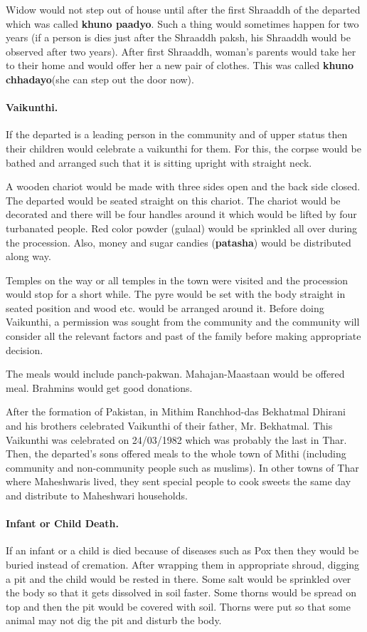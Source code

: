 Widow would not step out of house until after the first Shraaddh of the
departed which was called \textbf{khuno paadyo}. Such a thing would sometimes
happen for two years (if a person is dies just after the Shraaddh paksh, his
Shraaddh would be observed after two years). After first Shraaddh, woman's
parents would take her to their home and would offer her a new pair of clothes.
This was called \textbf{khuno chhadayo}(she can step out the door now). 

\paragraph{Vaikunthi.} If the departed is a leading person in the community and
of upper status then their children would celebrate a vaikunthi for them. For
this, the corpse would be bathed and arranged such that it is sitting upright
with straight neck. 

A wooden chariot would be made with three sides open and the back side closed.
The departed would be seated straight on this chariot. The chariot would be
decorated and there will be four handles around it which would be lifted by
four turbanated people. Red color powder (gulaal) would be sprinkled all over
during the procession. Also, money and sugar candies (\textbf{patasha}) would
be distributed along way.

Temples on the way or all temples in the town were visited and the procession
would stop for a short while. The pyre would be set with the body straight in
seated position and wood etc. would be arranged around it. Before doing
Vaikunthi, a permission was sought from the community and the community will
consider all the relevant factors and past of the family before making
appropriate decision.

The meals would include panch-pakwan. Mahajan-Maastaan would be offered meal.
Brahmins would get good donations.

After the formation of Pakistan, in Mithim Ranchhod-das Bekhatmal Dhirani and
his brothers celebrated Vaikunthi of their father, Mr. Bekhatmal. This
Vaikunthi was celebrated on 24/03/1982 which was probably the last in Thar.
Then, the departed's sons offered meals to the whole town of Mithi (including
community and non-community people such as muslims). In other towns of Thar
where Maheshwaris lived, they sent special people to cook sweets the same day
and distribute to Maheshwari households.

\paragraph{Infant or Child Death.} If an infant or a child is died because of
diseases such as Pox then they would be buried instead of cremation. After
wrapping them in appropriate shroud, digging a pit and the child would be
rested in there. Some salt would be sprinkled over the body so that it gets
dissolved in soil faster. Some thorns would be spread on top and then the pit
would be covered with soil. Thorns were put so that some animal may not dig the
pit and disturb the body.

